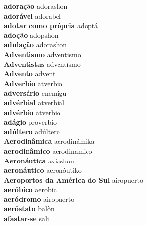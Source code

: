 \textbf{ adoração  } adorashon \\
\textbf{ adorável  } adorabel \\
\textbf{ adotar como própria  } adoptá \\
\textbf{ adoção  } adopshon \\
\textbf{ adulação  } adorashon \\
\textbf{ Adventismo  } adventismo \\
\textbf{ Adventistas  } adventismo \\
\textbf{ Advento  } advent \\
\textbf{ Adverbio  } atverbio \\
\textbf{ adversário  } enemigu \\
\textbf{ advérbial  } atverbial \\
\textbf{ advérbio  } atverbio \\
\textbf{ adágio  } proverbio \\
\textbf{ adúltero  } adúltero \\
\textbf{ Aerodinâmica  } aerodinámika \\
\textbf{ aerodinâmico  } aerodinamico \\
\textbf{ Aeronáutica  } aviashon \\
\textbf{ aeronáutico  } aeronóutiko \\
\textbf{ Aeroportos da América do Sul  } airopuerto \\
\textbf{ aeróbico  } aerobic \\
\textbf{ aeródromo  } airopuerto \\
\textbf{ aeróstato  } balòn \\
\textbf{ afastar-se  } sali \\
